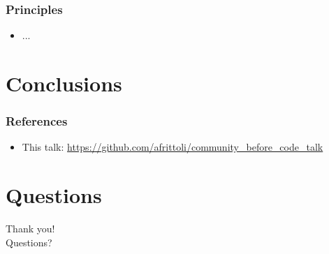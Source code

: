 \documentclass[aspectratio=169,11pt,hyperref={colorlinks=true}]{beamer}
\begin{document}
\begin{frame}
  \frametitle{Principles}
    \begin{itemize}
        \item{...}
    \end{itemize}
\end{frame}

\section{Conclusions}

\begin{frame}
  \frametitle{References}
  \begin{itemize}
      \item{This talk: \href{https://github.com/afrittoli/community\_before\_code\_talk}{https://github.com/afrittoli/community\_before\_code\_talk}}
  \end{itemize}
\end{frame}

\section{Questions}
\begin{frame}[c]
    \begin{center}
        \Huge Thank you!\\Questions?
    \end{center}
\end{frame}
\end{document}
